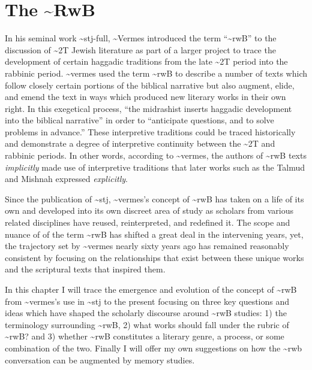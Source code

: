 \hypertarget{the-rwb}{%
\chapter{The \textasciitilde{}RwB}\label{the-rwb}}

In his seminal work \textasciitilde{}stj-full, \textasciitilde{}Vermes
introduced the term ``\textasciitilde{}rwB'' to the discussion of
\textasciitilde{}2T Jewish literature as part of a larger project to
trace the development of certain haggadic traditions from the late
\textasciitilde{}2T period into the rabbinic period.
\textasciitilde{}vermes used the term \textasciitilde{}rwB to describe a
number of texts which follow closely certain portions of the biblical
narrative but also augment, elide, and emend the text in ways which
produced new literary works in their own right. In this exegetical
process, ``the midrashist inserts haggadic development into the biblical
narrative'' in order to ``anticipate questions, and to solve problems in
advance.''\autocites[95]{vermes1961}[see also][]{vermes_zsengeller2014}
These interpretive traditions could be traced historically and
demonstrate a degree of interpretive continuity between the
\textasciitilde{}2T and rabbinic periods. In other words, according to
\textasciitilde{}vermes, the authors of \textasciitilde{}rwB texts
\emph{implicitly} made use of interpretive traditions that later works
such as the Talmud and Mishnah expressed \emph{explicitly}.

Since the publication of \textasciitilde{}stj, \textasciitilde{}vermes's
concept of \textasciitilde{}rwB has taken on a life of its own and
developed into its own discreet area of study as scholars from various
related disciplines have reused, reinterpreted, and redefined it. The
scope and nuance of of the term \textasciitilde{}rwB has shifted a great
deal in the intervening years, yet, the trajectory set by
\textasciitilde{}vermes nearly sixty years ago has remained reasonably
consistent by focusing on the relationships that exist between these
unique works and the scriptural texts that inspired them.

In this chapter I will trace the emergence and evolution of the concept
of \textasciitilde{}rwB from \textasciitilde{}vermes's use in
\textasciitilde{}stj to the present focusing on three key questions and
ideas which have shaped the scholarly discourse around
\textasciitilde{}rwB studies: 1) the terminology surrounding
\textasciitilde{}rwB, 2) what works should fall under the rubric of
\textasciitilde{}rwB? and 3) whether \textasciitilde{}rwB constitutes a
literary genre, a process, or some combination of the two. Finally I
will offer my own suggestions on how the \textasciitilde{}rwb
conversation can be augmented by memory studies.

